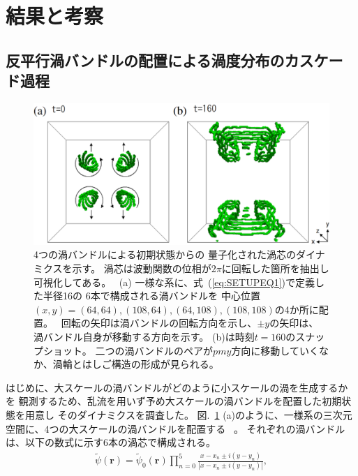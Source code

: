 \documentclass[12pt,a4paper]{jbook}
\begin{document}
		\section{結果と考察}
    		\subsection{反平行渦バンドルの配置による渦度分布のカスケード過程}
            \label{s:nucleation}
    		\begin{figure}[H]
    			\centering
    			\includegraphics[width=15cm]{fig11.eps}
    			\caption{
    				4つの渦バンドルによる初期状態からの
    				量子化された渦芯のダイナミクスを示す。
    				渦芯は波動関数の位相が$2\pi$に回転した箇所を抽出し可視化してある。
    				\
    				(a) 一様な系に、式~(\ref{eq:SETUPEQ1})で定義した半径16の
    				6本で構成される渦バンドルを
    				中心位置$(x,y)=(64,64),(108,64),(64,108),(108,108)$の4か所に配置。
    				\
    				回転の矢印は渦バンドルの回転方向を示し、$\pm y$の矢印は、
    				渦バンドル自身が移動する方向を示す。
    				(b)は時刻$t=160$のスナップショット。
    				二つの渦バンドルのペアが$pm y$方向に移動していくなか、渦輪とはしご構造の形成が見られる。
				}
				\label{FIG:SETUP}
			\end{figure}
			はじめに、大スケールの渦バンドルがどのように小スケールの渦を生成するかを
			観測するため、乱流を用いず予め大スケールの渦バンドルを配置した初期状態を用意し
            そのダイナミクスを調査した。
			図.~\ref{FIG:SETUP} (a)のように、一様系の三次元空間に、4つの大スケールの渦バンドルを配置する
			~\cite{Yasuda}。
			それぞれの渦バンドルは、以下の数式に示す6本の渦芯で構成される。
			\begin{eqnarray}
				\label{eq:SETUPEQ1}
				\tilde{\psi}({\bm r}) =
				\tilde{\psi}_0({\bm r}) \prod_{n=0}^5
					\frac{x - x_n \pm i(y - y_n)}
					{|x - x_n \pm i(y - y_n)|},
			\end{eqnarray}
\end{document}
